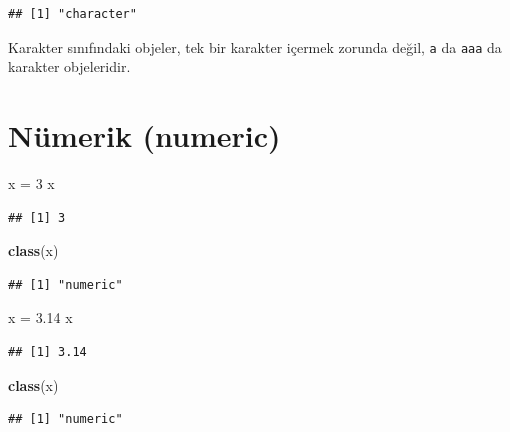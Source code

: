 \documentclass[]{book}
\newenvironment{Shaded}{\begin{snugshade}}{\end{snugshade}}
\newcommand{\DecValTok}[1]{\textcolor[rgb]{0.00,0.00,0.81}{#1}}
\newcommand{\FloatTok}[1]{\textcolor[rgb]{0.00,0.00,0.81}{#1}}
\newcommand{\KeywordTok}[1]{\textcolor[rgb]{0.13,0.29,0.53}{\textbf{#1}}}
\newcommand{\NormalTok}[1]{#1}
\newcommand{\StringTok}[1]{\textcolor[rgb]{0.31,0.60,0.02}{#1}}
\begin{document}
\begin{verbatim}
## [1] "character"
\end{verbatim}

Karakter sınıfındaki objeler, tek bir karakter içermek zorunda değil,
\texttt{\textquotesingle{}a\textquotesingle{}} da
\texttt{\textquotesingle{}aaa\textquotesingle{}} da karakter
objeleridir.

\hypertarget{numerik-numeric}{%
\section{Nümerik (numeric)}\label{numerik-numeric}}

\begin{Shaded}
\begin{Highlighting}[]
\NormalTok{x =}\StringTok{ }\DecValTok{3}
\NormalTok{x}
\end{Highlighting}
\end{Shaded}

\begin{verbatim}
## [1] 3
\end{verbatim}

\begin{Shaded}
\begin{Highlighting}[]
\KeywordTok{class}\NormalTok{(x)}
\end{Highlighting}
\end{Shaded}

\begin{verbatim}
## [1] "numeric"
\end{verbatim}

\begin{Shaded}
\begin{Highlighting}[]
\NormalTok{x =}\StringTok{ }\FloatTok{3.14}
\NormalTok{x}
\end{Highlighting}
\end{Shaded}

\begin{verbatim}
## [1] 3.14
\end{verbatim}

\begin{Shaded}
\begin{Highlighting}[]
\KeywordTok{class}\NormalTok{(x)}
\end{Highlighting}
\end{Shaded}

\begin{verbatim}
## [1] "numeric"
\end{verbatim}
\end{document}

